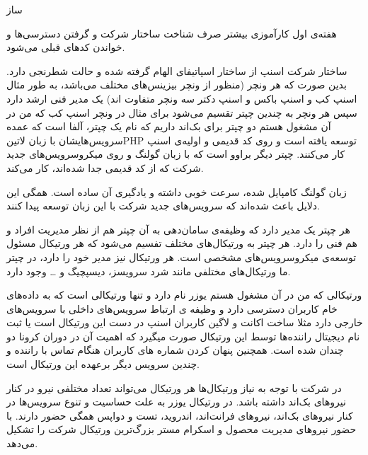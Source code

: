 \documentclass[a4]{report}
\begin{document}


‌ساز



هفته‌ی اول کارآموزی بیشتر صرف شناخت ساختار شرکت و گرفتن دسترسی‌ها و خواندن کدهای قبلی می‌شود.

ساختار شرکت اسنپ از ساختار اسپاتیفای الهام گرفته شده و حالت شطرنجی دارد.
بدین صورت که هر ونچر (منظور از ونچر بیزینس‌های مختلف می‌باشد،
به طور مثال اسنپ کب و اسنپ باکس و اسنپ دکتر سه ونچر متفاوت اند)
یک مدیر فنی ارشد دارد سپس هر ونچر به چندین چپتر تقسیم می‌شود برای مثال در ونچر اسنپ کب که من در آن مشغول هستم
دو چپتر برای بک‌اند داریم که نام یک چپتر، آلفا است که عمده سرویس‌هایشان با زبان ‌لاتین{PHP} توسعه یافته است و روی کد قدیمی و اولیه‌ی اسنپ کار می‌کنند.
چپتر دیگر براوو است که با زبان گولنگ و روی میکروسرویس‌های جدید شرکت که از کد قدیمی جدا شده‌اند، کار می‌کند.

زبان گولنگ کامپایل شده، سرعت خوبی داشته و یادگیری آن ساده است. همگی این دلایل باعث شده‌اند که سرویس‌های جدید شرکت با این زبان توسعه پیدا کنند.

هر چپتر یک مدیر دارد که وظیفه‌ی سامان‌دهی به آن چپتر هم از نظر مدیریت افراد و هم فنی را دارد.
هر چپتر به ورتیکال‌های مختلف تفسیم می‌شود که هر ورتیکال مسئول توسعه‌ی میکروسرویس‌های مشخصی است.
هر ورتیکال نیز مدیر خود را دارد، در چپتر ما ورتیکال‌های مختلفی مانند شرد سرویسز، دیسپچیگ و … وجود دارد.

ورتیکالی که من در آن مشغول هستم یوزر نام دارد و تنها ورتیکالی است که به داده‌های خام کاربران دسترسی دارد و وظیفه ی ارتباط سرویس‌های داخلی
با سرویس‌های خارجی دارد مثلا ساخت اکانت و لاگین کاربران اسنپ در دست این ورتیکال است
یا ثبت نام دیجیتال راننده‌ها توسط این ورتیکال صورت میگیرد که اهمیت آن در دوران کرونا دو چندان شده است.
همچنین پنهان کردن شماره های کاربران هنگام تماس با راننده و چندین سرویس دیگر برعهده این ورتیکال است.

در شرکت با توجه به نیاز ورتیکال‌ها هر ورتیکال می‌تواند تعداد مختلفی نیرو در کنار نیروهای بک‌اند داشته باشد.
در ورتیکال یوزر به علت حساسیت و تنوع سرویس‌ها در کنار نیروهای بک‌اند،
نیروهای فرانت‌اند، اندروید، تست و دواپس همگی حضور دارند.
با حضور نیروهای مدیریت محصول و اسکرام مستر بزرگ‌ترین ورتیکال شرکت را تشکیل می‌دهد.
\end{document}
